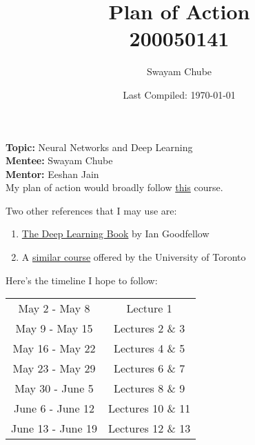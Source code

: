 \documentclass[12pt]{article}
\title{Plan of Action\\200050141}
\author{Swayam Chube}
\date{Last Compiled: \today}
\begin{document}
	\maketitle 
	\textbf{Topic:} Neural Networks and Deep Learning\\
	\textbf{Mentee:} Swayam Chube\\
	\textbf{Mentor:} Eeshan Jain\\

	My plan of action would broadly follow \href{http://people.csail.mit.edu/moitra/408b.html}{this} course. 

	Two other references that I may use are:
	\begin{enumerate}
		\item \href{https://www.deeplearningbook.org/}{The Deep Learning Book} by Ian Goodfellow
		\item A \href{https://www.cs.toronto.edu/~rgrosse/courses/csc421_2019/}{similar course} offered by the University of Toronto
	\end{enumerate}

	Here's the timeline I hope to follow:

	\begin{center}
	\begin{tabular}{|c|c|}
		\hline
		May 2 - May 8 & Lecture 1\\
		May 9 - May 15 & Lectures 2 \& 3\\
		May 16 - May 22 & Lectures 4 \& 5\\
		May 23 - May 29 & Lectures 6 \& 7\\
		May 30 - June 5 & Lectures 8 \& 9\\
		June 6 - June 12 & Lectures 10 \& 11\\
		June 13 - June 19 & Lectures 12 \& 13\\
		\hline
	\end{tabular}
	\end{center}
\end{document}
